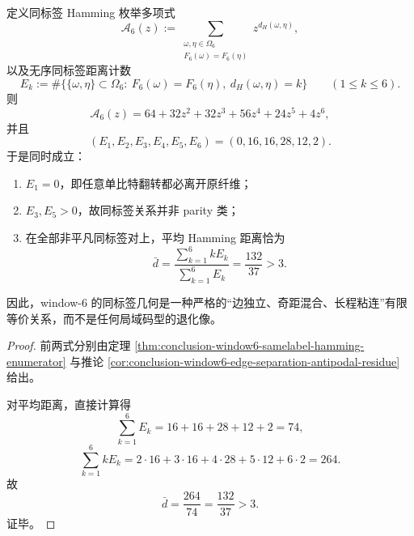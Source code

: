 \begin{theorem}\label{thm:conclusion-window6-samelabel-edgeless-oddmixed-longrange}
定义同标签 Hamming 枚举多项式
\[
\mathcal A_6(z)
:=
\sum_{\substack{\omega,\eta\in\Omega_6\\ F_6(\omega)=F_6(\eta)}}z^{d_H(\omega,\eta)},
\]
以及无序同标签距离计数
\[
E_k:=\#\bigl\{\{\omega,\eta\}\subset \Omega_6:\ F_6(\omega)=F_6(\eta),\ d_H(\omega,\eta)=k\bigr\}
\qquad (1\le k\le 6).
\]
则
\[
\mathcal A_6(z)=64+32z^2+32z^3+56z^4+24z^5+4z^6,
\]
并且
\[
(E_1,E_2,E_3,E_4,E_5,E_6)=(0,16,16,28,12,2).
\]
于是同时成立：
\begin{enumerate}
\normalfont
  \item \(E_1=0\)，即任意单比特翻转都必离开原纤维；
  \item \(E_3,E_5>0\)，故同标签关系并非 parity 类；
  \item 在全部非平凡同标签对上，平均 Hamming 距离恰为
  \[
  \bar d
  =
  \frac{\sum_{k=1}^6 kE_k}{\sum_{k=1}^6 E_k}
  =
  \frac{132}{37}
  >
  3.
  \]
\end{enumerate}
因此，window-\(6\) 的同标签几何是一种严格的“边独立、奇距混合、长程粘连”有限等价关系，而不是任何局域码型的退化像。
\end{theorem}
\begin{proof}
前两式分别由定理 \ref{thm:conclusion-window6-samelabel-hamming-enumerator} 与推论 \ref{cor:conclusion-window6-edge-separation-antipodal-residue} 给出。

对平均距离，直接计算得
\[
\sum_{k=1}^6E_k=16+16+28+12+2=74,
\]
\[
\sum_{k=1}^6kE_k
=
2\cdot 16+3\cdot 16+4\cdot 28+5\cdot 12+6\cdot 2
=
264.
\]
故
\[
\bar d=\frac{264}{74}=\frac{132}{37}>3.
\]
证毕。
\end{proof}

